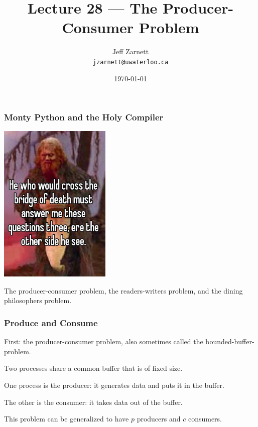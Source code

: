 

\title{Lecture 28 --- The Producer-Consumer Problem }

\author{Jeff Zarnett \\ \small \texttt{jzarnett@uwaterloo.ca}}
\date{\today}




\begin{frame}
	\titlepage

\end{frame}


\begin{frame}
	\frametitle{Monty Python and the Holy Compiler}

	\begin{center}
		\includegraphics[width=0.4\textwidth]{images/three-riddles.jpg}
	\end{center}

	The producer-consumer problem, the readers-writers problem, and the dining philosophers problem.

\end{frame}


\begin{frame}
	\frametitle{Produce and Consume}

	First: the producer-consumer problem, also sometimes called the bounded-buffer-problem.

	Two processes share a common buffer that is of fixed size.

	One process is the producer: it generates data and puts it in the buffer.

	The other is the consumer: it takes data out of the buffer.

	This problem can be generalized to have $p$ producers and $c$ consumers.

\end{frame}

